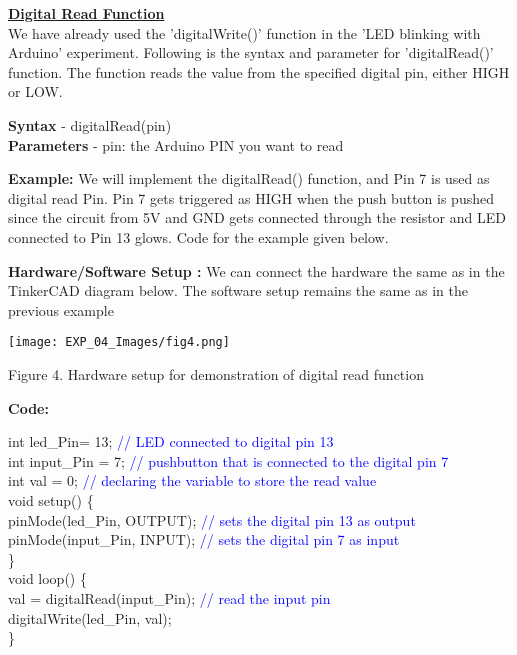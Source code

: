 \documentclass[12pt,a4paper]{article}
\begin{document}
\setlength{\parindent}{0eM}
\begin{justify}
\textbf{\underline{Digital Read Function}}\\
We have already used the 'digitalWrite()' function in the 'LED blinking with Arduino' experiment. Following is the syntax and parameter for 'digitalRead()' function. The function reads the value from the specified digital pin, either HIGH or LOW.

\noindent \textbf{Syntax }- digitalRead(pin)\\
\textbf{Parameters }- pin: the Arduino PIN you want to read

\noindent\textbf{Example:} We will implement the digitalRead() function, and Pin 7 is used as digital read Pin. Pin 7 gets triggered as HIGH when the push button is pushed since the circuit from 5V and GND gets connected through the resistor and LED connected to Pin 13 glows. Code for the example given below.\par
\noindent \textbf{Hardware/Software Setup :} We can connect the hardware the same as in the TinkerCAD diagram below. The software setup remains the same as in the previous example
\end{justify}

\vspace{-4mm}
\begin{center} 
\texttt{[image: EXP\_04\_Images/fig4.png]}
\end{center}
\vspace{-7mm}
\begin{center} {Figure 4. Hardware setup for demonstration of digital read function}\end{center}
\vspace{-3mm}

\hspace{1.5cm}\textbf{\large Code:}\\[6pt]
\setlength{\parindent}{8eM}

int led\_Pin= 13;  \textcolor{blue}{// LED connected to digital pin 13}\\
int input\_Pin = 7; \textcolor{blue}{  // pushbutton that is connected to the digital pin 7}\\
int val = 0; \textcolor{blue}{  // declaring the variable to store the read value}\\
void setup() \{\\
  pinMode(led\_Pin, OUTPUT);\textcolor{blue}{  // sets the digital pin 13 as output}\\
  pinMode(input\_Pin, INPUT); \textcolor{blue}{   // sets the digital pin 7 as input}\\
\}\\
void loop() \{\\
  val = digitalRead(input\_Pin); \textcolor{blue}{ // read the input pin}\\
    digitalWrite(led\_Pin, val);\\
\}\\
\end{document}
